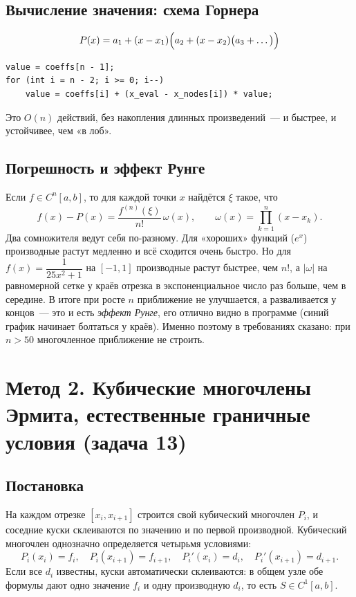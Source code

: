 \documentclass[11pt,a4paper]{report}
\begin{document}
\subsection{Вычисление значения: схема Горнера}

\[
P(x)=a_1+(x-x_1)\Bigl(a_2+(x-x_2)\bigl(a_3+\dots\bigr)\Bigr)
\]
\begin{lstlisting}[style=cpp]
value = coeffs[n - 1];
for (int i = n - 2; i >= 0; i--)
    value = coeffs[i] + (x_eval - x_nodes[i]) * value;
\end{lstlisting}
Это $O(n)$ действий, без накопления длинных произведений~--- и быстрее, и
устойчивее, чем «в лоб».

\subsection{Погрешность и эффект Рунге}

Если $f\in C^{n}[a,b]$, то для каждой точки $x$ найдётся $\xi$ такое, что
\[
f(x)-P(x)=\frac{f^{(n)}(\xi)}{n!}\,\omega(x),\qquad
\omega(x)=\prod_{k=1}^{n}(x-x_k).
\]
Два сомножителя ведут себя по-разному. Для «хороших» функций ($e^x$)
производные растут медленно и всё сходится очень быстро. Но для
$f(x)=\dfrac{1}{25x^2+1}$ на $[-1,1]$ производные растут быстрее, чем $n!$,
а $|\omega|$ на равномерной сетке у краёв отрезка в экспоненциальное число раз
больше, чем в середине. В итоге при росте $n$ приближение не улучшается, а
разваливается у концов~--- это и есть \emph{эффект Рунге}, его отлично видно в
программе (синий график начинает болтаться у краёв). Именно поэтому в
требованиях сказано: при $n>50$ многочленное приближение не строить.

\section{Метод 2. Кубические многочлены Эрмита, естественные граничные условия (задача 13)}

\subsection{Постановка}

На каждом отрезке $[x_i,x_{i+1}]$ строится свой кубический многочлен $P_i$,
и соседние куски склеиваются по значению и по первой производной. Кубический
многочлен однозначно определяется четырьмя условиями:
\[
P_i(x_i)=f_i,\quad P_i(x_{i+1})=f_{i+1},\quad
P_i'(x_i)=d_i,\quad P_i'(x_{i+1})=d_{i+1}.
\]
Если все $d_i$ известны, куски автоматически склеиваются: в общем узле обе
формулы дают одно значение $f_i$ и одну производную $d_i$, то есть
$S\in C^1[a,b]$.
\end{document}
